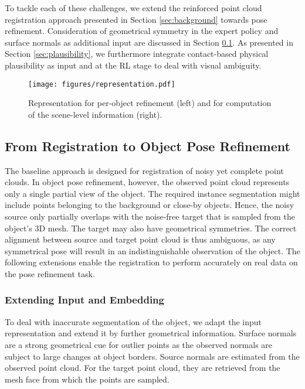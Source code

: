 \documentclass[10pt,twocolumn,letterpaper]{article}
\begin{document}
To tackle each of these challenges, we extend the reinforced point cloud registration approach presented in Section \ref{sec:background} towards pose refinement. Consideration of geometrical symmetry in the expert policy and surface normals as additional input are discussed in Section \ref{sec:reg-to-ref}. As presented in Section \ref{sec:plausibility}, we furthermore integrate contact-based physical plausibility as input and at the RL stage to deal with visual ambiguity.

\begin{figure}
    \centering
    \texttt{[image: figures/representation.pdf]}
    \caption{Representation for per-object refinement (left) and for computation of the scene-level information (right).}
    \label{fig:representation}
\end{figure}

\subsection{From Registration to Object Pose Refinement}\label{sec:reg-to-ref}
The baseline approach is designed for registration of noisy yet complete point clouds. In object pose refinement, however, the observed point cloud represents only a single partial view of the object. The required instance segmentation might include points belonging to the background or close-by objects. Hence, the noisy source only partially overlaps with the noise-free target that is sampled from the object's 3D mesh. The target may also have geometrical symmetries. The correct alignment between source and target point cloud is thus ambiguous, as any symmetrical pose will result in an indistinguishable observation of the object. The following extensions enable the registration to perform accurately on real data on the pose refinement task.

\subsubsection{Extending Input and Embedding}
To deal with inaccurate segmentation of the object, we adapt the input representation and extend it by further geometrical information. Surface normals are a strong geometrical cue for outlier points as the observed normals are subject to large changes at object borders. Source normals are estimated from the observed point cloud. For the target point cloud, they are retrieved from the mesh face from which the points are sampled.
\end{document}
